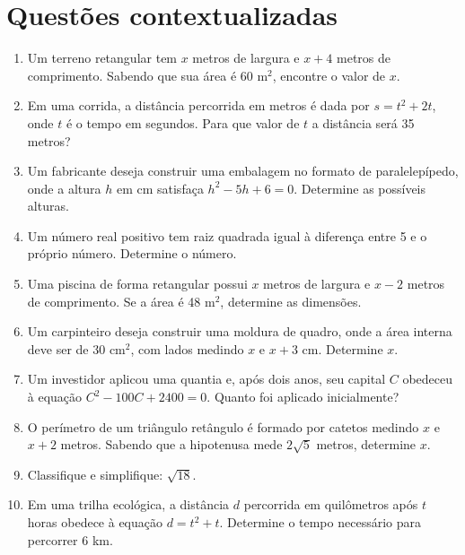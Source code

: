 \documentclass[12pt,a4paper]{article}
\begin{document}
\section*{Questões contextualizadas}

\begin{enumerate}

\item Um terreno retangular tem \(x\) metros de largura e \(x+4\) metros de comprimento. Sabendo que sua \'{a}rea \'e 60 m$^2$, encontre o valor de \(x\).

\item Em uma corrida, a dist\^{a}ncia percorrida em metros \'e dada por \(s = t^2 + 2t\), onde \(t\) \'e o tempo em segundos. Para que valor de \(t\) a dist\^{a}ncia ser\'a 35 metros?

\item Um fabricante deseja construir uma embalagem no formato de paralelep\'ipedo, onde a altura \(h\) em cm satisfa\c{c}a \(h^2 - 5h + 6 = 0\). Determine as poss\'iveis alturas.

\item Um n\'umero real positivo tem raiz quadrada igual \`a diferen\c{c}a entre 5 e o pr\'oprio n\'umero. Determine o n\'umero.

\item Uma piscina de forma retangular possui \(x\) metros de largura e \(x-2\) metros de comprimento. Se a \'{a}rea \'e 48 m$^2$, determine as dimens\~oes.

\item Um carpinteiro deseja construir uma moldura de quadro, onde a \'{a}rea interna deve ser de 30 cm$^2$, com lados medindo \(x\) e \(x+3\) cm. Determine \(x\).

\item Um investidor aplicou uma quantia e, ap\'os dois anos, seu capital \(C\) obedeceu \`a equa\c{c}\~ao \(C^2 - 100C + 2400 = 0\). Quanto foi aplicado inicialmente?

\item O per\'imetro de um tri\^angulo ret\^angulo \'e formado por catetos medindo \(x\) e \(x+2\) metros. Sabendo que a hipotenusa mede \(2\sqrt{5}\) metros, determine \(x\).

\item Classifique e simplifique: \(\sqrt{18}\).

\item Em uma trilha ecol\'ogica, a dist\^{a}ncia \(d\) percorrida em quil\^ometros ap\'os \(t\) horas obedece \`a equa\c{c}\~ao \(d = t^2 + t\). Determine o tempo necess\'ario para percorrer 6 km.


\end{enumerate}
\end{document}
